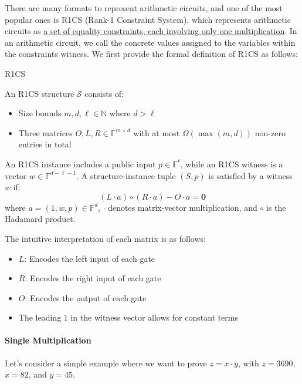 \documentclass{article}
\begin{document}
There are many formats to represent arithmetic circuits, and one of the most popular ones is R1CS (Rank-1 Constraint System), which represents arithmetic circuits as \underline{a set of equality constraints, each involving only one multiplication}. In an arithmetic circuit, we call the concrete values assigned to the variables within the constraints witness. We first provide the formal definition of R1CS as follows:

\begin{definition}{R1CS}{}

An R1CS structure $\mathcal{S}$ consists of:
\begin{itemize}
\item Size bounds $m, d, \ell \in \mathbb{N}$ where $d > \ell$
\item Three matrices $O, L, R \in \mathbb{F}^{m\times d}$ with at most $ \Omega(\max(m, d))$ non-zero entries in total
\end{itemize}

An R1CS instance includes a public input $p \in \mathbb{F}^\ell$, while an R1CS witness is a vector $w \in \mathbb{F}^{d - \ell - 1}$.
A structure-instance tuple $(S, p)$ is satisfied by a witness $w$ if:
\begin{equation}
(L \cdot a) \circ (R \cdot a) - O \cdot a = \mathbf{0}
\end{equation}
where $a = (1, w, p) \in \mathbb{F}^d$, $\cdot$ denotes matrix-vector multiplication, and $\circ$ is the Hadamard product.

\end{definition}

The intuitive interpretation of each matrix is as follows:

\begin{itemize}
\item $L$: Encodes the left input of each gate
\item $R$: Encodes the right input of each gate
\item $O$: Encodes the output of each gate
\item The leading 1 in the witness vector allows for constant terms
\end{itemize}

\paragraph{Single Multiplication}

Let's consider a simple example where we want to prove $z = x \cdot y$, with $z = 3690$, $x = 82$, and $y = 45$.
\end{document}
